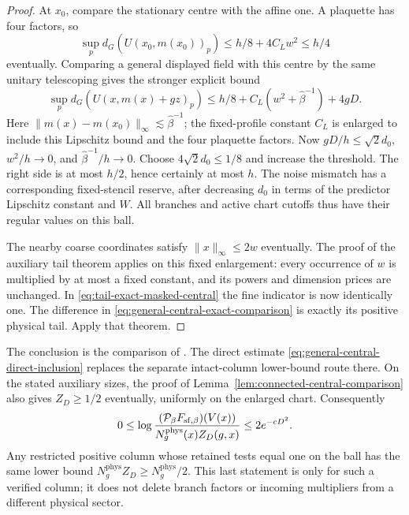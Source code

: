 \documentclass[11pt,reqno]{amsart}
\numberwithin{equation}{section}
\theoremstyle{definition}
\theoremstyle{remark}
\begin{document}
\begin{proof}
At \(x_0\), compare the stationary centre with the affine one.
A plaquette has four factors, so
\[
 \sup_p d_G(U(x_0,m(x_0))_p)
       \le h/8+4C_Lw^2\le h/4
\]
eventually. Comparing a general displayed field with this centre
by the same unitary telescoping gives the stronger explicit bound
\begin{equation}
 \sup_p d_G(U(x,m(x)+gz)_p)
  \le h/8+C_L(w^2+\widehat\beta^{-1})+4gD.
 \label{eq:general-central-direct-inclusion}
\end{equation}
Here \(\|m(x)-m(x_0)\|_\infty
\lesssim\widehat\beta^{-1}\); the fixed-profile constant
\(C_L\) is enlarged to include this Lipschitz bound and
the four plaquette factors.
Now \(gD/h\le\sqrt2d_0\),
\(w^2/h\to0\), and \(\widehat\beta^{-1}/h\to0\).
Choose \(4\sqrt2d_0\le1/8\) and increase the threshold.
The right side is at most \(h/2\), hence certainly at most
\(h\). The noise mismatch has a corresponding fixed-stencil
reserve, after decreasing \(d_0\) in terms of the predictor
Lipschitz constant and \(W\). All branches and active chart
cutoffs thus have their regular values on this ball.

The nearby coarse coordinates satisfy \(\|x\|_\infty\le2w\)
eventually. The proof of the auxiliary tail theorem applies on
this fixed enlargement: every occurrence of \(w\) is multiplied
by at most a fixed constant, and its powers and dimension prices
are unchanged. In \eqref{eq:tail-exact-masked-central} the fine
indicator is now identically one. The difference in
\eqref{eq:general-central-exact-comparison} is exactly its positive
physical tail. Apply that theorem.
\end{proof}

The conclusion is the comparison of
\cite[Theorem~19.4 and Corollary~19.5, p.~99]{Main}.
The direct estimate \eqref{eq:general-central-direct-inclusion}
replaces the separate intact-column lower-bound route there.
On the stated auxiliary sizes, the proof of
Lemma~\ref{lem:connected-central-comparison} also gives
\(Z_D\ge1/2\) eventually, uniformly on the enlarged chart.
Consequently
\[
 0\le\log\frac{(\mathcal P_\beta F_{{\rm sf},\beta})(V(x))}
                         {N_g^{\mathrm{phys}}(x)Z_D(g,x)}\le2e^{-cD^2}.
\]
Any restricted positive column whose retained tests equal one on
the ball has the same lower bound \(N_g^{\mathrm{phys}} Z_D\ge N_g^{\mathrm{phys}}/2\).
This last statement is only for such a verified column; it does
not delete branch factors or incoming multipliers from a different
physical sector.
\end{document}
